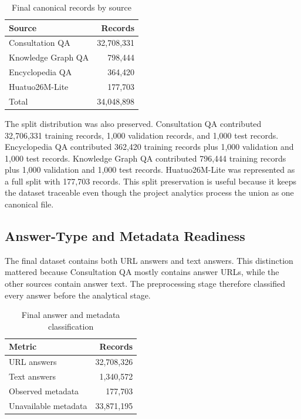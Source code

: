 \documentclass[12pt,a4paper]{article}
\begin{document}
\begin{table}[H]
\centering
\caption{Final canonical records by source}
\label{tab:full-source-composition}
\begin{tabular}{lr}
\toprule
Source & Records \\
\midrule
Consultation QA & 32,708,331 \\
Knowledge Graph QA & 798,444 \\
Encyclopedia QA & 364,420 \\
Huatuo26M-Lite & 177,703 \\
\midrule
Total & 34,048,898 \\
\bottomrule
\end{tabular}
\end{table}

The split distribution was also preserved. Consultation QA contributed 32,706,331 training records, 1,000 validation records, and 1,000 test records. Encyclopedia QA contributed 362,420 training records plus 1,000 validation and 1,000 test records. Knowledge Graph QA contributed 796,444 training records plus 1,000 validation and 1,000 test records. Huatuo26M-Lite was represented as a full split with 177,703 records. This split preservation is useful because it keeps the dataset traceable even though the project analytics process the union as one canonical file.

\subsection{Answer-Type and Metadata Readiness}

The final dataset contains both URL answers and text answers. This distinction mattered because Consultation QA mostly contains answer URLs, while the other sources contain answer text. The preprocessing stage therefore classified every answer before the analytical stage.

\begin{table}[H]
\centering
\caption{Final answer and metadata classification}
\label{tab:full-answer-metadata}
\begin{tabular}{lr}
\toprule
Metric & Records \\
\midrule
URL answers & 32,708,326 \\
Text answers & 1,340,572 \\
Observed metadata & 177,703 \\
Unavailable metadata & 33,871,195 \\
\bottomrule
\end{tabular}
\end{table}
\end{document}
